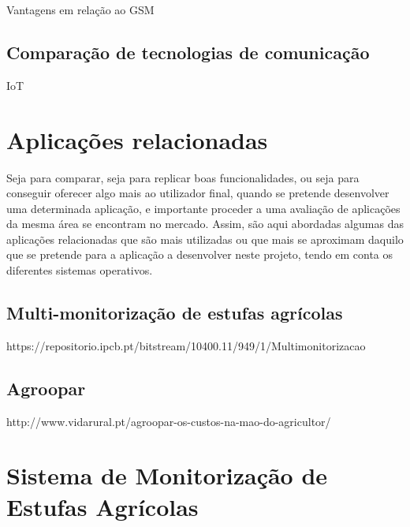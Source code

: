 Vantagens em relação ao GSM


\subsection{Comparação de tecnologias de comunicação}





\ac{IoT}


\section{Aplicações relacionadas}



Seja para comparar, seja para replicar boas funcionalidades, ou seja para conseguir oferecer algo mais ao utilizador final, quando se pretende desenvolver uma determinada aplicação, e
importante proceder a uma avaliação de aplicações da mesma área se encontram no mercado.
Assim, são aqui abordadas algumas das aplicações relacionadas que são mais utilizadas ou que mais se aproximam daquilo que se pretende para a aplicação a desenvolver neste projeto,
tendo em conta os diferentes sistemas operativos.



\subsection{Multi-monitorização de estufas agrícolas }

https://repositorio.ipcb.pt/bitstream/10400.11/949/1/Multimonitorizacao%

\subsection{Agroopar}

http://www.vidarural.pt/agroopar-os-custos-na-mao-do-agricultor/


\section{Sistema de Monitorização de Estufas Agrícolas}


\cite{Abreu2012}